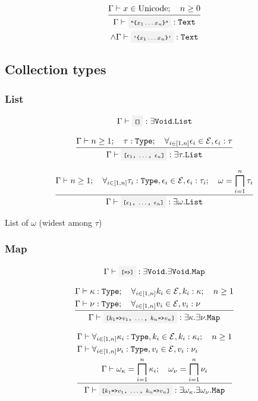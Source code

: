
\[
	\infrule{
		\EnvSym\then x \in \text{Unicode} \semiq n \geq 0
	}{
		\EnvSym\then \code{"\{$x_1 \dotsc x_n$\}"} : \Text \\*
		\land \EnvSym\then \code{'\{$x_1 \dotsc x_n$\}'} : \Text
	}
\]


\clearpage

\subsection{Collection types}

\subsubsection{List}

\[
	\EnvSym\then \code{[]}:\exists\Void.\List
\]

\[
	\infrule{
		\EnvSym\then n \geq 1 \semiq \tau:\Type \semiq \forall_{i\in[1,n]}{\expr_i\in\Expr,\expr_i:\tau}
	}{
		\EnvSym\then \code{[$\expr_1$, $\dotsc$, $\expr_n$]}:\exists\tau.\List
	}
\]

\[
	\infrule{
		\EnvSym\then n \geq 1 \semiq \forall_{i\in[1,n]}{\tau_i:\Type,\expr_i\in\Expr,\expr_i:\tau_i} \semiq \omega = \biglwb_{i=1}^{n}{\tau_i}
	}{
		\EnvSym\then \code{[$\expr_1$, $\dotsc$, $\expr_n$]}:\exists\omega.\List
	}
\]

List of $\omega$ (widest among $\tau$)

\subsubsection{Map}

\[
	\EnvSym\then \code{[=>]}:\exists\Void.\exists\Void.\Map
\]

\[
	\infrule{
		\EnvSym\then \kappa:\Type \semiq \forall_{i\in[1,n]}{k_i\in\Expr,k_i:\kappa} \semiq n \geq 1 \\*
		\EnvSym\then \nu:\Type \semiq \forall_{i\in[1,n]}{v_i\in\Expr,v_i:\nu} \hfill
	}{
		\EnvSym\then \code{[$k_1$=>$v_1$, $\dotsc$, $k_n$=>$v_n$]}:\exists\kappa.\exists\nu.\Map
	}
\]

\[
	\infrule{
		\EnvSym\then \forall_{i \in [1,n]}{\kappa_i:\Type, k_i\in\Expr, k_i:\kappa_i} \semiq n \geq 1 \\*
		\EnvSym\then \forall_{i \in [1,n]}{\nu_i:\Type, v_i\in\Expr, v_i:\nu_i} \hfill\\*
		\EnvSym\then \omega_\kappa = \biglwb_{i=1}^{n}{\kappa_i} \semiq \omega_\nu = \biglwb_{i=1}^{n}{\nu_i}
	}{
		\EnvSym\then \code{[$k_1$=>$v_1$, $\dotsc$, $k_n$=>$v_n$]}:\exists\omega_\kappa.\exists\omega_\nu.\Map
	}
\]

